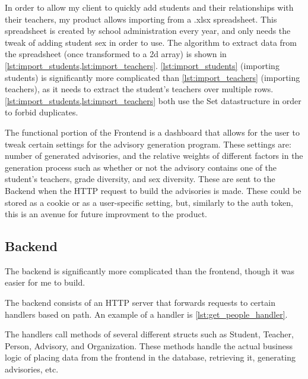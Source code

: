 \documentclass[advisory-ia.tex]{subfiles}
\begin{document}
  In order to allow my client to quickly add students and their relationships with their teachers, my product allows importing from a .xlsx spreadsheet.
  This spreadsheet is created by school administration every year, and only needs the tweak of adding student sex in order to use.
  The algorithm to extract data from the spreadsheet (once transformed to a 2d array) is shown in \cref{lst:import_students,lst:import_teachers}.
  \cref{lst:import_students} (importing students) is significantly more complicated than \cref{lst:import_teachers} (importing teachers), as it needs to extract the student's teachers over multiple rows.
  \cref{lst:import_students,lst:import_teachers} both use the Set datastructure in order to forbid duplicates.

  

  

  The functional portion of the Frontend is a dashboard that allows for the user to tweak certain settings for the advisory generation program.
  These settings are: number of generated advisories, and the relative weights of different factors in the generation process such as whether or not the advisory contains one of the student's teachers, grade diversity, and sex diversity.
  These are sent to the Backend when the HTTP request to build the advisories is made.
  These could be stored as a cookie or as a user-specific setting, but, similarly to the auth token, this is an avenue for future improvment to the product.

  \subsection{Backend}
  \label{subsec:backend}
  The backend is significantly more complicated than the frontend, though it was easier for me to build.

  The backend consists of an HTTP server that forwards requests to certain handlers based on path.
  An example of a handler is \cref{lst:get_people_handler}.

  

  The handlers call methods of several different structs such as Student, Teacher, Person, Advisory, and Organization.
  These methods handle the actual business logic of placing data from the frontend in the database, retrieving it, generating advisories, etc.
\end{document}
